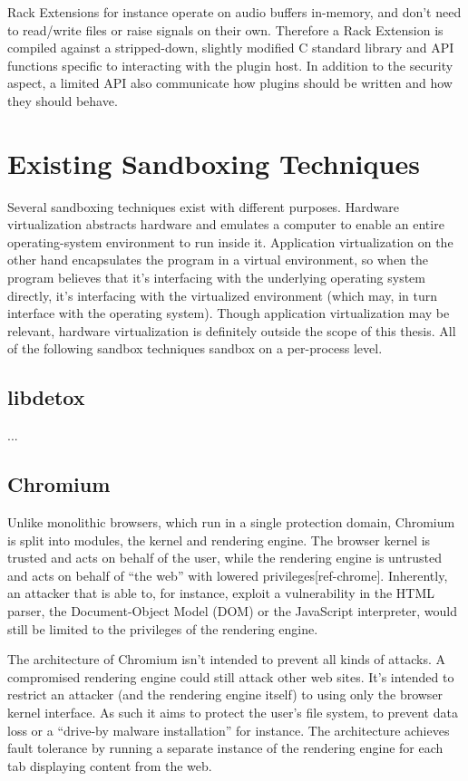 Rack Extensions for instance operate on audio buffers in-memory, and don't need
to read/write files or raise signals on their own. Therefore a Rack Extension is
compiled against a stripped-down, slightly modified C standard library and API
functions specific to interacting with the plugin host. In addition to the
security aspect, a limited API also communicate how plugins should be written
and how they should behave.


\section {Existing Sandboxing Techniques}

Several sandboxing techniques exist with different purposes. Hardware
virtualization abstracts hardware and emulates a computer to enable an entire
operating-system environment to run inside it. Application virtualization on the
other hand encapsulates the program in a virtual environment, so when the
program believes that it's interfacing with the underlying operating system
directly, it's interfacing with the virtualized environment (which may, in turn
interface with the operating system). Though application virtualization may be
relevant, hardware virtualization is definitely outside the scope of this
thesis. All of the following sandbox techniques sandbox on a per-process level.

\subsection {libdetox}

...

\subsection {Chromium}

Unlike monolithic browsers, which run in a single protection domain, Chromium
is split into modules, the kernel and rendering engine. The browser kernel is
trusted and acts on behalf of the user, while the rendering engine is untrusted
and acts on behalf of ``the web'' with lowered privileges[ref-chrome].
Inherently, an attacker that is able to, for instance, exploit a vulnerability
in the HTML parser, the Document-Object Model (DOM) or the JavaScript
interpreter, would still be limited to the privileges of the rendering engine.

The architecture of Chromium isn't intended to prevent all kinds of attacks. A
compromised rendering engine could still attack other web sites. It's intended
to restrict an attacker (and the rendering engine itself) to using only the
browser kernel interface. As such it aims to protect the user's file system, to
prevent data loss or a ``drive-by malware installation'' for instance. The
architecture achieves fault tolerance by running a separate instance of the
rendering engine for each tab displaying content from the web.


